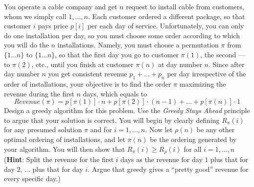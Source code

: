 \documentclass[11pt]{article}
\newcommand{\hint}[1]{({\bf Hint}: {#1})}
\begin{document}
\noindent
You operate a cable company and get $n$ request to install cable from
customers, whom we simply call $1,\ldots, n$. Each customer ordered a
different package, so that customer $i$ pays price $p[i]$ per each day
of service. Unfortunately, you can only do one installation per day,
so you must choose some order according to which you will do the $n$
installations. Namely, you must choose a permutation $\pi$ from
$\{1\ldots n\}$ to $\{1\ldots n\}$, so that the first day you go to
customer $\pi(1)$, the second --- to $\pi(2)$, etc., until you finish
at customer $\pi(n)$ at day number $n$. Since after day number $n$ you
get consistent revenue $p_1+\ldots+p_n$ per day irrespective of the
order of installations, your objective is to find the order $\pi$
maximizing the revenue during the first $n$ days, which equals to
$$Revenue(\pi) = p[\pi(1)]\cdot n + p[\pi(2)]\cdot (n-1) + \ldots +
p[\pi(n)]\cdot 1$$ Design a greedy algorithm for this problem. Use the
{\em Greedy Stays Ahead} principle to argue that your solution is
correct. You will begin by clearly defining $R_\pi(i)$ for any presumed solution $\pi$ 
and for $i=1,\ldots,n$.
Now let $\rho(n)$ be any other optimal ordering of installations, 
and let $\pi(n)$ be the ordering generated by your algorithm. You will 
then show that $R_\pi(i)\geq R_\rho(i)$ for all $i=1,\ldots,n$ \\
\hint{Split the revenue for the first $i$ days as the revenue for day
$1$ plus that for day $2$, $\ldots$ plus that for day $i$. Argue that
greedy gives a ``pretty good'' revenue for every specific day.}
\end{document}
